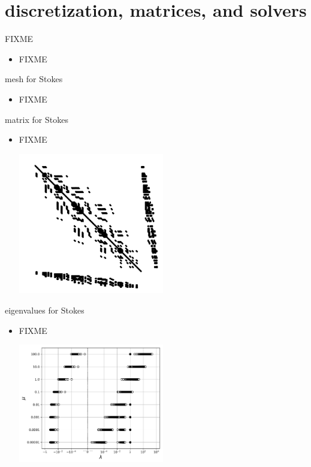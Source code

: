 \documentclass[10pt,hyperref,dvipsnames]{beamer}
\begin{document}
\section{discretization, matrices, and solvers}

\begin{frame}{FIXME}

\begin{itemize}
\item FIXME
\end{itemize}
\end{frame}

\begin{frame}{mesh for Stokes}

\begin{itemize}
\item FIXME
\begin{center}

\end{center}
\end{itemize}
\end{frame}


\begin{frame}{matrix for Stokes}

\begin{itemize}
\item FIXME
\begin{center}
\includegraphics[width=0.5\textwidth]{figs/Kstokes.pdf}
\end{center}
\end{itemize}
\end{frame}


\begin{frame}{eigenvalues for Stokes}

\begin{itemize}
\item FIXME
\begin{center}
\includegraphics[width=0.5\textwidth]{figs/stokesmueigs.pdf}
\end{center}
\end{itemize}
\end{frame}
\end{document}
